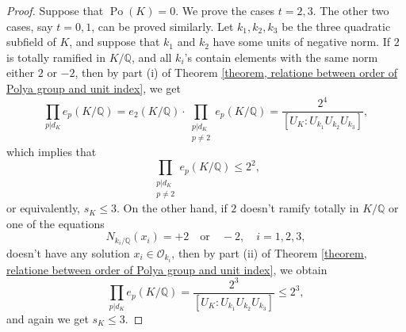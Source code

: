 \documentclass[10pt,a4paper]{amsart}
\DeclareMathOperator{\Po}{Po}
\begin{document}
\begin{proof}
 Suppose that $\Po(K)=0$. We prove the cases $t=2,3$. The other two cases, say $t=0,1$, can be proved similarly. Let $k_1,k_2,k_3$ be the three quadratic subfield of $K$, and suppose that $k_1$ and $k_2$ have some units of negative norm. If $2$ is totally ramified in $K/\mathbb{Q}$, and all $k_i$'s contain elements with the same norm either $2$ or $-2$, then by part (i) of Theorem \ref{theorem, relatione between order of Polya group and unit index}, we get
\begin{equation*}
\prod_{p | d_K} e_p(K/\mathbb{Q})=e_2(K/\mathbb{Q}) \cdot \prod_{\substack{p | d_K\\ p \neq 2}} e_p(K/\mathbb{Q}) = \frac{2^4}{\left[U_K : U_{k_1} U_{k_2} U_{k_3}\right]},
\end{equation*}
which implies that 
\begin{equation*}
 \prod_{\substack{p | d_K\\ p \neq 2}} e_p(K/\mathbb{Q}) \leq 2^2,
\end{equation*}
or equivalently, $s_K \leq 3$. On the other hand, if $2$ doesn't ramify totally in $K/\mathbb{Q}$ or one of the equations
\begin{equation*}
N_{k_i/\mathbb{Q}}(x_i)=+2 \quad \text{or} \quad -2, \quad i=1,2,3,
\end{equation*}
doesn't have any solution $x_i \in \mathcal{O}_{k_i}$, then by part (ii) of Theorem \ref{theorem, relatione between order of Polya group and unit index}, we obtain
\begin{equation*}
	\prod_{p | d_K} e_p(K/\mathbb{Q}) = \frac{2^3}{\left[U_K : U_{k_1} U_{k_2} U_{k_3}\right]} \leq 2^3,
\end{equation*}
and again we get $s_K \leq 3$.
\end{proof}
\end{document}
